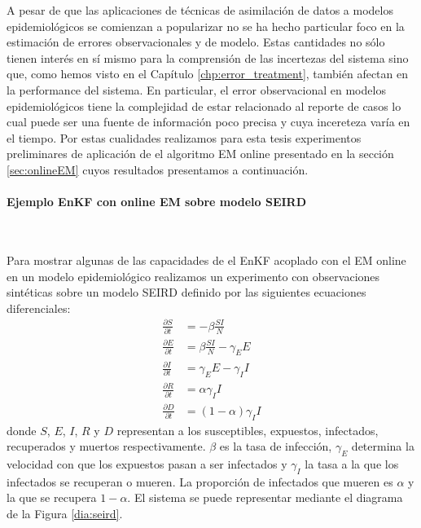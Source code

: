 A pesar de que las aplicaciones de técnicas de asimilación de datos a modelos epidemiológicos se comienzan a popularizar no se ha hecho particular foco en la estimación de errores observacionales y de modelo. Estas cantidades no sólo tienen interés en sí mismo para la comprensión de las incertezas del sistema sino que, como hemos visto en el Capítulo \ref{chp:error_treatment}, también afectan en la performance del sistema. En particular, el error observacional en modelos epidemiológicos tiene la complejidad de estar relacionado al reporte de casos lo cual puede ser una fuente de información poco precisa y cuya incereteza varía en el tiempo. Por estas cualidades realizamos para esta tesis experimentos preliminares de aplicación de el algoritmo EM online presentado en la sección \ref{sec:onlineEM} cuyos resultados presentamos a continuación.

\paragraph{Ejemplo EnKF con online EM sobre modelo SEIRD} \

Para mostrar algunas de las capacidades de el EnKF acoplado con el EM online en un modelo epidemiológico realizamos un experimento con observaciones sintéticas sobre un modelo SEIRD definido por las siguientes ecuaciones diferenciales:
\begin{align} \label{eq:seird}
    \frac{\partial S}{\partial t} &= -\beta \frac{SI}{N}\\
    \frac{\partial E}{\partial t} &= \beta \frac{SI}{N} - \gamma_E E \\
    \frac{\partial I}{\partial t} &= \gamma_E E - \gamma_I I \\
    \frac{\partial R}{\partial t} &= \alpha \gamma_I I \\
    \frac{\partial D}{\partial t} &= (1-\alpha) \gamma_I I
\end{align}
donde $S$, $E$, $I$, $R$ y $D$ representan a los susceptibles, expuestos, infectados, recuperados y muertos respectivamente. $\beta$ es la tasa de infección, $\gamma_E$ determina la velocidad con que los expuestos pasan a ser infectados y $\gamma_I$ la tasa a la que los infectados se recuperan o mueren. La proporción de infectados que mueren es $\alpha$ y la que se recupera $1 - \alpha$. El sistema se puede representar mediante el diagrama de la Figura \ref{dia:seird}. 

